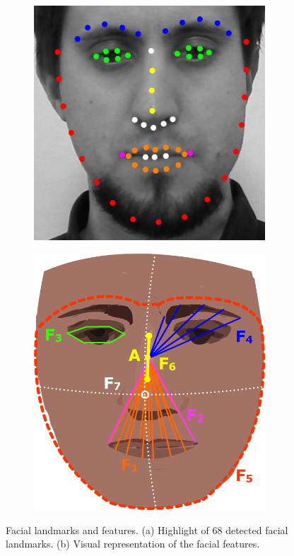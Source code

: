 \begin{figure}
\centering
  \begin{subfigure}[b]{0.5\textwidth}
    \includegraphics[width=0.95\textwidth]{Content/figures/facial-landmarks-detail.png}
    \caption{}
    \label{fig:facial-landmarks}
  \end{subfigure}%
  \begin{subfigure}[b]{0.5\textwidth}
    \centering
    \includegraphics[width=0.95\textwidth]{Content/figures/facial-features.png}
    \caption{}
    \label{fig:facial-features}
  \end{subfigure}
  \caption{Facial landmarks and features. (a) Highlight of 68 detected facial landmarks. (b) Visual representation of the facial features.}
  \label{fig:faces}
\end{figure}



